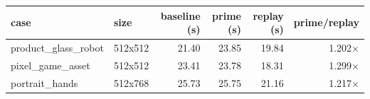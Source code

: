\begin{tabular}{@{}llrrrr@{}}
\toprule
case & size & baseline (s) & prime (s) & replay (s) & prime/replay \\
\midrule
product\_glass\_robot & 512x512 & 21.40 & 23.85 & 19.84 & 1.202$\times$ \\
pixel\_game\_asset & 512x512 & 23.41 & 23.78 & 18.31 & 1.299$\times$ \\
portrait\_hands & 512x768 & 25.73 & 25.75 & 21.16 & 1.217$\times$ \\
\bottomrule
\end{tabular}
